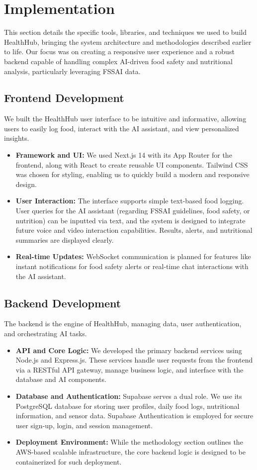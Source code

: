 \section{Implementation}

This section details the specific tools, libraries, and techniques we used to build HealthHub, bringing the system architecture and methodologies described earlier to life. Our focus was on creating a responsive user experience and a robust backend capable of handling complex AI-driven food safety and nutritional analysis, particularly leveraging FSSAI data.

\subsection{Frontend Development}
We built the HealthHub user interface to be intuitive and informative, allowing users to easily log food, interact with the AI assistant, and view personalized insights.
\begin{itemize}
    \item \textbf{Framework and UI:} We used Next.js 14 with its App Router for the frontend, along with React to create reusable UI components. Tailwind CSS was chosen for styling, enabling us to quickly build a modern and responsive design.
    \item \textbf{User Interaction:} The interface supports simple text-based food logging. User queries for the AI assistant (regarding FSSAI guidelines, food safety, or nutrition) can be inputted via text, and the system is designed to integrate future voice and video interaction capabilities. Results, alerts, and nutritional summaries are displayed clearly.
    \item \textbf{Real-time Updates:} WebSocket communication is planned for features like instant notifications for food safety alerts or real-time chat interactions with the AI assistant.
\end{itemize}

\subsection{Backend Development}
The backend is the engine of HealthHub, managing data, user authentication, and orchestrating AI tasks.
\begin{itemize}
    \item \textbf{API and Core Logic:} We developed the primary backend services using Node.js and Express.js. These services handle user requests from the frontend via a RESTful API gateway, manage business logic, and interface with the database and AI components.
    \item \textbf{Database and Authentication:} Supabase serves a dual role. We use its PostgreSQL database for storing user profiles, daily food logs, nutritional information, and sensor data. Supabase Authentication is employed for secure user sign-up, login, and session management.
    \item \textbf{Deployment Environment:} While the methodology section outlines the AWS-based scalable infrastructure, the core backend logic is designed to be containerized for such deployment.
\end{itemize}

